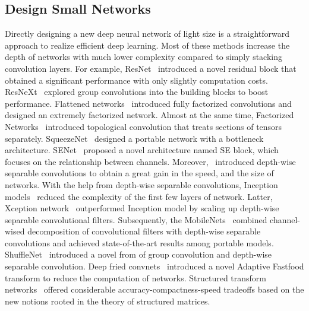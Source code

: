 \documentclass[journal]{IEEEtran}
\begin{document}
\subsection{Design Small Networks}
Directly designing a new deep neural network of light size is a straightforward approach to realize efficient deep learning. Most of these methods increase the depth of networks with much lower complexity compared to simply stacking convolution layers. For example, ResNet~\cite{he2016deep} introduced a novel residual block that obtained a significant performance with only slightly computation costs. ResNeXt~\cite{xie2017aggregated} explored group convolutions into the building blocks to boost performance. Flattened networks~\cite{jin2014flattened} introduced fully factorized convolutions and designed an extremely factorized network. Almost at the same time, Factorized Networks~\cite{wang2016factorized} introduced topological convolution that treats sections of tensors separately. SqueezeNet~\cite{iandola2016squeezenet} designed a portable network with a bottleneck architecture. SENet~\cite{hu2017squeeze} proposed a novel architecture named SE block, which focuses on the relationship between channels. Moreover,~\cite{vanhoucke2014learning} introduced depth-wise separable convolutions to obtain a great gain in the speed, and the size of networks. With the help from depth-wise separable convolutions, Inception models~\cite{szegedy2015going,normalization2015accelerating} reduced the complexity of the first few layers of network. Latter, Xception network~\cite{chollet2017xception} outperformed Inception model by scaling up depth-wise separable convolutional filters. Subsequently, the MobileNets~\cite{howard2017mobilenets} combined channel-wised decomposition of convolutional filters with depth-wise separable convolutions and achieved state-of-the-art results among portable models. ShuffleNet~\cite{zhang2017shufflenet} introduced a novel from of group convolution and depth-wise separable convolution. Deep fried convnets~\cite{yang2015deep} introduced a novel Adaptive Fastfood transform to reduce the computation of networks. Structured transform networks~\cite{NIPS2015_5869} offered considerable accuracy-compactness-speed tradeoffs based on the new notions rooted in the theory of structured matrices.
\end{document}

